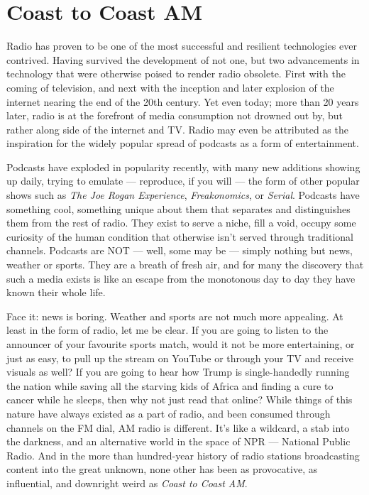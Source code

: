 \vspace{6pt}

\section{Coast to Coast AM}\label{sec:coastcoastam}

Radio has proven to be one of the most successful and resilient technologies ever contrived.
Having survived the development of not one, but two advancements in technology that were otherwise
poised to render radio obsolete. First with the coming of television, and next with the inception
and later explosion of the internet nearing the end of the 20th century. Yet even today; more than
20 years later, radio is at the forefront of media consumption not drowned out by, but rather along
side of the internet and TV. Radio may even be attributed as the inspiration for the widely popular
spread of podcasts as a form of entertainment.

Podcasts have exploded in popularity recently, with many new additions showing up daily, trying to
emulate --- reproduce, if you will --- the form of other popular shows such as \emph{The Joe Rogan
Experience}, \emph{Freakonomics}, or \emph{Serial}. Podcasts have something cool, something unique
about them that separates and distinguishes them from the rest of radio. They exist to serve a niche,
fill a void, occupy some curiosity of the human condition that otherwise isn't served through
traditional channels. Podcasts are NOT --- well, some may be --- simply nothing but news, weather or
sports. They are a breath of fresh air, and for many the discovery that such a media exists is like an
escape from the monotonous day to day they have known their whole life.

Face it: news is boring. Weather and sports are not much more appealing. At least in the form of radio,
let me be clear. If you are going to listen to the announcer of your favourite sports match, would it
not be more entertaining, or just as easy, to pull up the stream on YouTube or through your TV and
receive visuals as well? If you are going to hear how Trump is single-handedly running the nation while
saving all the starving kids of Africa and finding a cure to cancer while he sleeps, then why not just
read that online? While things of this nature have always existed as a part of radio, and been consumed
through channels on the FM dial, AM radio is different. It's like a wildcard, a stab into the darkness,
and an alternative world in the space of NPR --- National Public Radio. And in the more than
hundred-year history of radio stations broadcasting content into the great unknown, none other has
been as provocative, as influential, and downright weird as \emph{Coast to Coast AM}.

